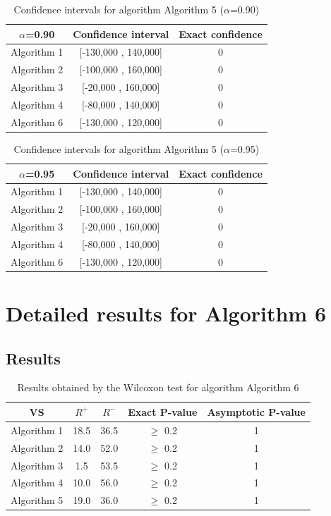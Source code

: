 \documentclass[a4paper,10pt]{article}
\begin{document}
\begin{table}[!htp]
\centering\small
\begin{tabular}{
|c|c|c|}
\hline
 $\alpha$=0.90 & Confidence interval & Exact confidence \\ \hline 
Algorithm 1 & [-130,000 , 140,000] & 0\\ \hline 
Algorithm 2 & [-100,000 , 160,000] & 0\\ \hline 
Algorithm 3 & [-20,000 , 160,000] & 0\\ \hline 
Algorithm 4 & [-80,000 , 140,000] & 0\\ \hline 
Algorithm 6 & [-130,000 , 120,000] & 0\\ \hline 

\end{tabular}
\caption{Confidence intervals for algorithm Algorithm 5 ($\alpha$=0.90)}
\end{table}
\begin{table}[!htp]
\centering\small
\begin{tabular}{
|c|c|c|}
\hline
 $\alpha$=0.95 & Confidence interval & Exact confidence \\ \hline 
Algorithm 1 & [-130,000 , 140,000] & 0\\ \hline 
Algorithm 2 & [-100,000 , 160,000] & 0\\ \hline 
Algorithm 3 & [-20,000 , 160,000] & 0\\ \hline 
Algorithm 4 & [-80,000 , 140,000] & 0\\ \hline 
Algorithm 6 & [-130,000 , 120,000] & 0\\ \hline 

\end{tabular}
\caption{Confidence intervals for algorithm Algorithm 5 ($\alpha$=0.95)}
\end{table}

 \clearpage 


\section{Detailed results for Algorithm 6}


\subsection{Results}

\begin{table}[!htp]
\centering\small
\begin{tabular}{
|c|c|c|c|c|}
\hline
 VS & $R^{+}$ & $R^{-}$ & Exact P-value & Asymptotic P-value \\ \hline 
Algorithm 1 & 18.5 & 36.5 & $\geq$ 0.2 & 1\\ \hline 
Algorithm 2 & 14.0 & 52.0 & $\geq$ 0.2 & 1\\ \hline 
Algorithm 3 & 1.5 & 53.5 & $\geq$ 0.2 & 1\\ \hline 
Algorithm 4 & 10.0 & 56.0 & $\geq$ 0.2 & 1\\ \hline 
Algorithm 5 & 19.0 & 36.0 & $\geq$ 0.2 & 1\\ \hline 

\end{tabular}
\caption{Results obtained by the Wilcoxon test for algorithm Algorithm 6}
\end{table}
\end{document}

